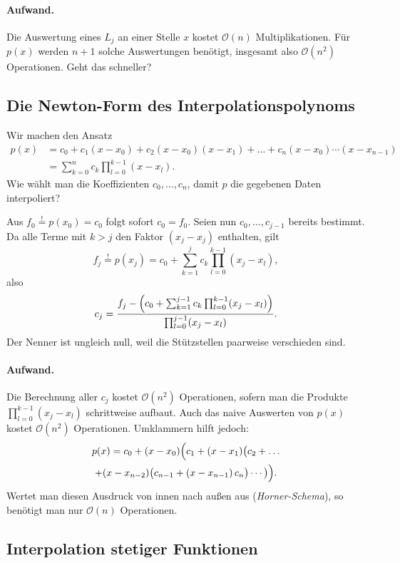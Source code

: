 \documentclass[11pt]{article}
\begin{document}
\paragraph{Aufwand.}
Die Auswertung eines $L_j$ an einer Stelle $x$ kostet $\mathcal{O}(n)$ Multiplikationen.
Für $p(x)$ werden $n+1$ solche Auswertungen benötigt, insgesamt also $\mathcal{O}(n^2)$ Operationen.
Geht das schneller?

\subsection{Die Newton-Form des Interpolationspolynoms}

Wir machen den Ansatz
\begin{align*}
  p(x) &= c_0 + c_1(x - x_0) + c_2(x - x_0)(x - x_1) + \dots + c_n(x - x_0) \dotsm (x - x_{n-1}) \\
       &= \sum_{k=0}^{n} c_k \prod_{l=0}^{k-1} (x - x_l).
\end{align*}
Wie wählt man die Koeffizienten $c_0, \dots, c_n$, damit $p$ die gegebenen Daten interpoliert?


Aus $f_0 \overset{!}{=} p(x_0) = c_0$ folgt sofort $c_0 = f_0$.
Seien nun $c_0, \dots, c_{j-1}$ bereits bestimmt. Da alle Terme mit $k > j$ den Faktor $(x_j - x_j)$ enthalten, gilt
\[
  f_j \overset{!}{=} p(x_j) = c_0 + \sum_{k=1}^{j} c_k \prod_{l=0}^{k-1} (x_j - x_l),
\]
also
\[
  c_j = \frac{f_j - \Bigl(c_0 + \sum_{k=1}^{j-1} c_k \prod_{l=0}^{k-1} (x_j - x_l)\Bigr)}{\prod_{l=0}^{j-1} (x_j - x_l)}.
\]
Der Nenner ist ungleich null, weil die Stützstellen paarweise verschieden sind.


\paragraph{Aufwand.}
Die Berechnung aller $c_j$ kostet $\mathcal{O}(n^2)$ Operationen, sofern man die Produkte $\prod_{l=0}^{k-1}(x_j - x_l)$ schrittweise aufbaut.
Auch das naive Auswerten von $p(x)$ kostet $\mathcal{O}(n^2)$ Operationen.
Umklammern hilft jedoch:
\begin{multline*}
  p(x) = c_0 + (x - x_0)\Bigl(c_1 + (x - x_1)\bigl(c_2 + \dots \\
  + (x - x_{n-2})\bigl(c_{n-1} + (x - x_{n-1})\, c_n\bigr) \dotsm \bigr)\Bigr).
\end{multline*}
Wertet man diesen Ausdruck von innen nach außen aus (\emph{Horner-Schema}), so benötigt man nur $\mathcal{O}(n)$ Operationen.


\subsection{Interpolation stetiger Funktionen}
\end{document}
